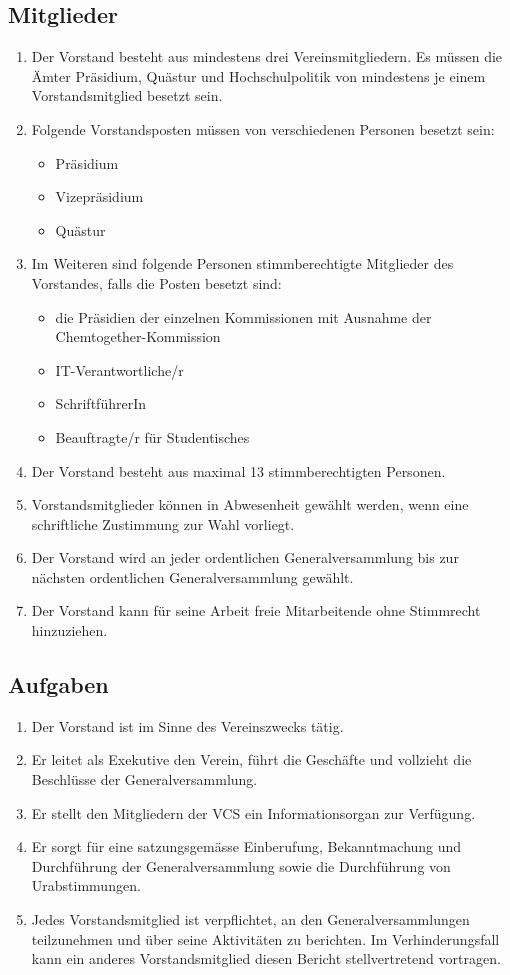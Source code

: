 \subsection{Mitglieder}
\begin{enumerate}
\item Der Vorstand besteht aus mindestens drei Vereinsmitgliedern. Es müssen die Ämter Präsidium, Quästur und Hochschulpolitik von mindestens je einem Vorstandsmitglied besetzt sein.
\item Folgende Vorstandsposten müssen von verschiedenen Personen besetzt sein:
	\begin{itemize}
	\item Präsidium
	\item Vizepräsidium
	\item Quästur
	\end{itemize}
\item Im Weiteren sind folgende Personen stimmberechtigte Mitglieder des Vorstandes, falls die Posten besetzt sind:
	\begin{itemize}
	\item die Präsidien der einzelnen Kommissionen mit Ausnahme der Chemtogether-Kommission 
	\item IT-Verantwortliche/r
	\item SchriftführerIn
	\item Beauftragte/r für Studentisches
	\end{itemize}
\item Der Vorstand besteht aus maximal 13 stimmberechtigten Personen.
\item Vorstandsmitglieder können in Abwesenheit gewählt werden, wenn eine schriftliche Zustimmung zur Wahl vorliegt.
\item Der Vorstand wird an jeder ordentlichen Generalversammlung bis zur nächsten ordentlichen Generalversammlung gewählt.
\item Der Vorstand kann für seine Arbeit freie Mitarbeitende ohne Stimmrecht hinzuziehen.
\end{enumerate}

\subsection{Aufgaben}
\begin{enumerate}
\item Der Vorstand ist im Sinne des Vereinszwecks tätig.
\item Er leitet als Exekutive den Verein, führt die Geschäfte und vollzieht die Beschlüsse der Generalversammlung.
\item Er stellt den Mitgliedern der VCS ein Informationsorgan zur Verfügung.
\item Er sorgt für eine satzungsgemässe Einberufung, Bekanntmachung und Durchführung der Generalversammlung sowie die Durchführung von Urabstimmungen.
\item Jedes Vorstandsmitglied ist verpflichtet, an den Generalversammlungen teilzunehmen und über seine Aktivitäten zu berichten. Im Verhinderungsfall kann ein anderes Vorstandsmitglied diesen Bericht stellvertretend vortragen.
\end{enumerate}

